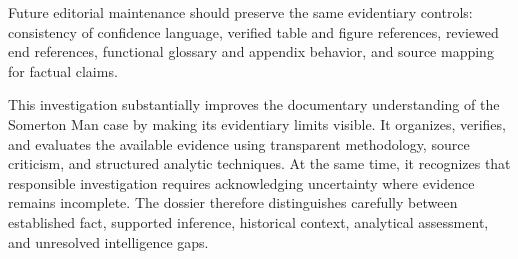 Future editorial maintenance should preserve the same evidentiary controls: consistency of confidence language, verified table and figure references, reviewed end references, functional glossary and appendix behavior, and source mapping for factual claims.

This investigation substantially improves the documentary understanding of the Somerton Man case by making its evidentiary limits visible. It organizes, verifies, and evaluates the available evidence using transparent methodology, source criticism, and structured analytic techniques. At the same time, it recognizes that responsible investigation requires acknowledging uncertainty where evidence remains incomplete. The dossier therefore distinguishes carefully between established fact, supported inference, historical context, analytical assessment, and unresolved intelligence gaps.
